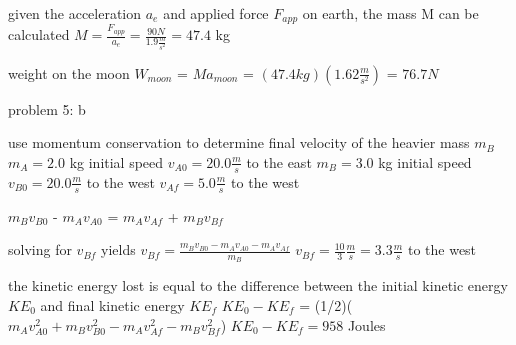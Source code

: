 given the acceleration $a_{e}$ and applied force $F_{app}$ on earth, the mass M can be calculated\newline
$M = \frac{F_{app}}{a_{e}} = \frac{90 N}{1.9 \frac{m}{s^{2}}} = 47.4$ kg\newline
                                              
weight on the moon $W_{moon}$ = $Ma_{moon}$ = $(47.4 kg)(1.62 \frac{m}{s^{2}} )$ = $76.7 N$\newline

problem 5: b\newline

use momentum conservation to determine final velocity of the heavier mass $m_{B}$\newline
$m_{A} = 2.0$ kg  initial speed $v_{A0} = 20.0 \frac{m}{s}$ to the east\newline
$m_{B} = 3.0$ kg  initial speed $v_{B0} = 20.0 \frac{m}{s}$ to the west\newline
$v_{Af} = 5.0 \frac{m}{s}$ to the west\newline

$m_{B}v_{B0}$ - $m_{A}v_{A0}$ = $m_{A}v_{Af}$ + $m_{B}v_{Bf}$\newline

solving for $v_{Bf}$ yields\newline
$v_{Bf} = \frac{m_{B}v_{B0} - m_{A}v_{A0} - m_{A}v_{Af}}{m_{B}}$\newline
$v_{Bf} = \frac{10}{3} \frac{m}{s} = 3.3 \frac{m}{s}$ to the west\newline
                                                 
the kinetic energy lost is equal to the difference between the initial kinetic\newline
energy $KE_{0}$ and final kinetic energy $KE_{f}$\newline
$KE_{0} - KE_{f}$ = (1/2)($m_{A}v_{A0}^{2} + m_{B}v_{B0}^{2} - m_{A}v_{Af}^{2} - m_{B}v_{Bf}^{2}$)\newline
$KE_{0} - KE_{f} = 958$ Joules
